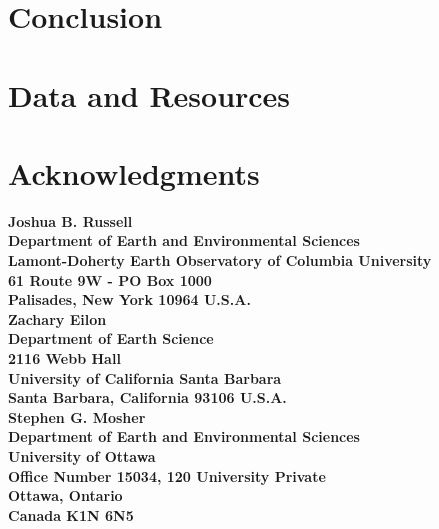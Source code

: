 \documentclass[12pt,titlepage]{article}
\begin{document}
\section{Conclusion }


\section{Data and Resources }


\section{Acknowledgments }


\newpage
{\bfseries\sffamily 
\noindent Joshua B. Russell \\
Department of Earth and Environmental Sciences \\
Lamont-Doherty Earth Observatory of Columbia University \\
61 Route 9W - PO Box 1000 \\
Palisades, New York 10964 U.S.A. \\

\noindent Zachary Eilon \\
Department of Earth Science \\
2116 Webb Hall \\
University of California Santa Barbara \\
Santa Barbara, California 93106 U.S.A. \\

\noindent Stephen G. Mosher \\
Department of Earth and Environmental Sciences \\
University of Ottawa \\
Office Number 15034, 120 University Private \\
Ottawa, Ontario \\
Canada K1N 6N5
}
\newpage
%
%



\newpage

\newpage

\end{document}
